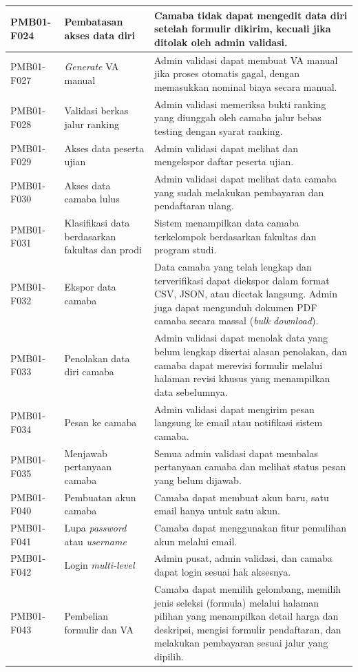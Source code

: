 \begin{longtable}{|p{}|p{}|p{}|}
	\hline
	PMB01-F024 & Pembatasan akses data diri & Camaba tidak dapat mengedit data diri setelah formulir dikirim, kecuali jika ditolak oleh admin validasi. \\
	\hline
	PMB01-F027 & \textit{Generate} VA manual & Admin validasi dapat membuat VA manual jika proses otomatis gagal, dengan memasukkan nominal biaya secara manual. \\
	\hline
	PMB01-F028 & Validasi berkas jalur ranking & Admin validasi memeriksa bukti ranking yang diunggah oleh camaba jalur bebas testing dengan syarat ranking. \\
	\hline
	PMB01-F029 & Akses data peserta ujian & Admin validasi dapat melihat dan mengekspor daftar peserta ujian. \\
	\hline
	PMB01-F030 & Akses data camaba lulus & Admin validasi dapat melihat data camaba yang sudah melakukan pembayaran dan pendaftaran ulang. \\
	\hline
	PMB01-F031 & Klasifikasi data berdasarkan fakultas dan prodi & Sistem menampilkan data camaba terkelompok berdasarkan fakultas dan program studi. \\
	\hline
	PMB01-F032 & Ekspor data camaba & Data camaba yang telah lengkap dan terverifikasi dapat diekspor dalam format CSV, JSON, atau dicetak langsung. Admin juga dapat mengunduh dokumen PDF camaba secara massal (\textit{bulk download}). \\
	\hline
	PMB01-F033 & Penolakan data diri camaba & Admin validasi dapat menolak data yang belum lengkap disertai alasan penolakan, dan camaba dapat merevisi formulir melalui halaman revisi khusus yang menampilkan data sebelumnya. \\
	\hline
	PMB01-F034 & Pesan ke camaba & Admin validasi dapat mengirim pesan langsung ke email atau notifikasi sistem camaba. \\
	\hline
	PMB01-F035 & Menjawab pertanyaan camaba & Semua admin validasi dapat membalas pertanyaan camaba dan melihat status pesan yang belum dijawab. \\
	\hline
	PMB01-F040 & Pembuatan akun camaba & Camaba dapat membuat akun baru, satu email hanya untuk satu akun. \\
	\hline
	PMB01-F041 & Lupa \textit{password} atau \textit{username} & Camaba dapat menggunakan fitur pemulihan akun melalui email. \\
	\hline
	PMB01-F042 & Login \textit{multi-level} & Admin pusat, admin validasi, dan camaba dapat login sesuai hak aksesnya. \\
	\hline
	PMB01-F043 & Pembelian formulir dan VA & Camaba dapat memilih gelombang, memilih jenis seleksi (formula) melalui halaman pilihan yang menampilkan detail harga dan deskripsi, mengisi formulir pendaftaran, dan melakukan pembayaran sesuai jalur yang dipilih. \\

\end{longtable}

